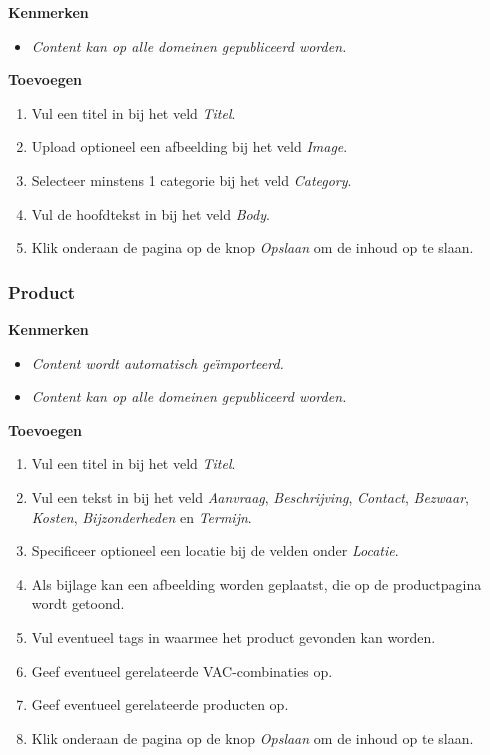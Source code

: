 \textbf{Kenmerken}

\begin{itemize}
\item \emph{Content kan op alle domeinen gepubliceerd worden.}
\end{itemize}

\textbf{Toevoegen}

\begin{enumerate}
\item Vul een titel in bij het veld \emph{Titel}.
\item Upload optioneel een afbeelding bij het veld \emph{Image}.
\item Selecteer minstens 1 categorie bij het veld \emph{Category}.
\item Vul de hoofdtekst in bij het veld \emph{Body}.
\item Klik onderaan de pagina op de knop \emph{Opslaan} om de inhoud op te slaan.
\end{enumerate}

\subsubsection{Product}\label{product}

\textbf{Kenmerken}

\begin{itemize}
\item \emph{Content wordt automatisch ge{\"\i}mporteerd.}
\item \emph{Content kan op alle domeinen gepubliceerd worden.}
\end{itemize}

\textbf{Toevoegen}

\begin{enumerate}
\item Vul een titel in bij het veld \emph{Titel}.
\item Vul een tekst in bij het veld \emph{Aanvraag}, \emph{Beschrijving}, \emph{Contact}, \emph{Bezwaar}, \emph{Kosten}, \emph{Bijzonderheden} en \emph{Termijn}.
\item Specificeer optioneel een locatie bij de velden onder \emph{Locatie}.
\item Als bijlage kan een afbeelding worden geplaatst, die op de productpagina wordt getoond.
\item Vul eventueel tags in waarmee het product gevonden kan worden.
\item Geef eventueel gerelateerde VAC-combinaties op.
\item Geef eventueel gerelateerde producten op.
\item Klik onderaan de pagina op de knop \emph{Opslaan} om de inhoud op te slaan.
\end{enumerate}

